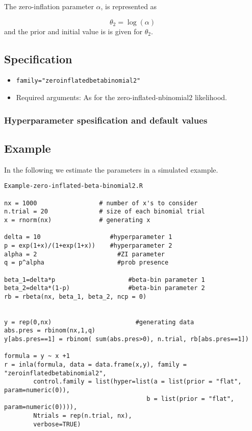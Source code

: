 \documentclass[a4paper,11pt]{article}
\begin{document}
\vspace{5mm}

\noindent
The zero-inflation parameter $\alpha$, is represented as

\begin{displaymath}
    \theta_2 = \log(\alpha)
\end{displaymath}
and the prior and initial value is is given for $\theta_{2}$.

\subsection*{Specification}

\begin{itemize}
\item \texttt{family="zeroinflatedbetabinomial2"}
\item Required arguments: As for the zero-inflated-nbinomial2
    likelihood.
\end{itemize}

\subsubsection*{Hyperparameter spesification and default values}


\subsection*{Example}

In the following we estimate the parameters in a simulated example.

\begin{verbatim}
Example-zero-inflated-beta-binomial2.R

nx = 1000                 # number of x's to consider
n.trial = 20              # size of each binomial trial
x = rnorm(nx)             # generating x

delta = 10                   #hyperparameter 1
p = exp(1+x)/(1+exp(1+x))    #hyperparameter 2
alpha = 2                      #ZI parameter
q = p^alpha                    #prob presence

beta_1=delta*p                    #beta-bin parameter 1
beta_2=delta*(1-p)                #beta-bin parameter 2                                 
rb = rbeta(nx, beta_1, beta_2, ncp = 0)

        
y = rep(0,nx)                       #generating data                    
abs.pres = rbinom(nx,1,q)
y[abs.pres==1] = rbinom( sum(abs.pres>0), n.trial, rb[abs.pres==1])

formula = y ~ x +1
r = inla(formula, data = data.frame(x,y), family = "zeroinflatedbetabinomial2",
        control.family = list(hyper=list(a = list(prior = "flat", param=numeric(0)),
                                       b = list(prior = "flat", param=numeric(0)))),
        Ntrials = rep(n.trial, nx),
        verbose=TRUE)
\end{verbatim}
\end{document}
